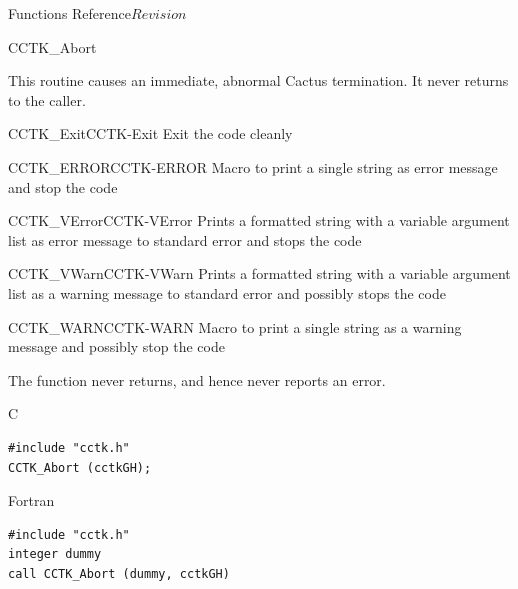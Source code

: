 \begin{cactuspart}{ Functions Reference}{}{$Revision$}
\begin{FunctionDescription}{CCTK\_Abort}
\begin{Discussion}
This routine causes an immediate, abnormal Cactus termination.
It never returns to the caller.
\end{Discussion}

\begin{SeeAlsoSection}
\begin{SeeAlso2}{CCTK\_Exit}{CCTK-Exit}
Exit the code cleanly
\end{SeeAlso2}
\begin{SeeAlso2}{CCTK\_ERROR}{CCTK-ERROR}
Macro to print a single string as error message and stop the code
\end{SeeAlso2}
\begin{SeeAlso2}{CCTK\_VError}{CCTK-VError}
Prints a formatted string with a variable argument list as error
message to standard error and stops the code
\end{SeeAlso2}
\begin{SeeAlso2}{CCTK\_VWarn}{CCTK-VWarn}
Prints a formatted string with a variable argument list as a warning
message to standard error and possibly stops the code
\end{SeeAlso2}
\begin{SeeAlso2}{CCTK\_WARN}{CCTK-WARN}
Macro to print a single string as a warning message and possibly stop the code
\end{SeeAlso2}
\end{SeeAlsoSection}

\begin{ErrorSection}
\begin{Error}{}
The function never returns, and hence never reports an error.
\end{Error}
\end{ErrorSection}

\begin{ExampleSection}
\begin{Example}{C}
\begin{verbatim}
#include "cctk.h"
CCTK_Abort (cctkGH);
\end{verbatim}
\end{Example}
\begin{Example}{Fortran}
\begin{verbatim}
#include "cctk.h"
integer dummy
call CCTK_Abort (dummy, cctkGH)
\end{verbatim}
\end{Example}
\end{ExampleSection}
\end{FunctionDescription}




\end{cactuspart}
